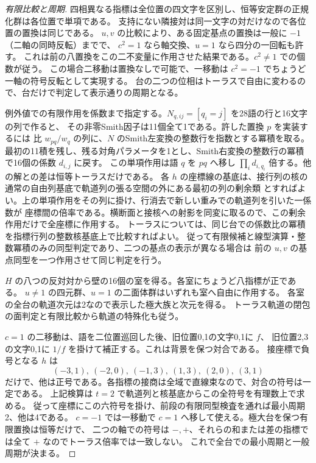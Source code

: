 \begin{proof}[有限比較と周期]
四相異なる指標は全位置の四文字を区別し、恒等安定群の正規化群は各位置で単項である。
支持にない隣接対は同一文字の対だけなので各位置の置換は同じである。
$u,v$ の比較により、ある固定基点の置換は一般に $-1$（二軸の同時反転）までで、
$c^2=1$ なら軸交換、$u=1$ なら四分の一回転も許す。
これは前の八置換をこの二不変量に作用させた結果である。$c^2\ne1$ での個数が従う。
この場合二移動は置換なしで可能で、一移動は $c^2=-1$ でちょうど一軸の符号反転として実現する。
台の二つの位相はトーラスで自由に変わるので、台だけで判定して表示通りの周期となる。

例外値での有限作用を係数まで指定する。$N_{q,ij}=[q_i=j]$ を28語の行と16文字の列で作ると、
その非零Smith因子は11個全て1である。許した置換 $p$ を実装するには
比 $w_{p q}/w_q$ の列に、$N$ のSmith左変換の整数行を指数とする冪積を取る。
最初の11積を残し、残る対角パラメータを1とし、Smith右変換の整数行の冪積で16個の係数 $d_{i,j}$ に戻す。
この単項作用は語 $q$ を $p q$ へ移し $\prod_i d_{i,q_i}$ 倍する。他の解との差は恒等トーラスだけである。
各 $h$ の座標線の基底は、接行列の核の通常の自由列基底で軌道列の張る空間の外にある最初の列の剰余類
とすればよい。上の単項作用をその列に掛け、行消去で新しい重みでの軌道列を引いた一係数が
座標間の倍率である。横断面と接核への射影を同変に取るので、この剰余作用だけで全座標に作用する。
トーラスについては、同じ台での係数比の冪積を指標行列の整数核基底上で比較すればよい。
従って有限候補と線型演算・整数冪積のみの同型判定であり、二つの基点の表示が異なる場合は
前の $u,v$ の基点同型を一つ作用させて同じ判定を行う。

$H$ の八つの反対対から壁の16個の室を得る。各室にちょうど八指標が正である。
$u\ne1$ の四元群、$u=1$ の二面体群はいずれも室へ自由に作用する。
各室の全台の軌道次元は2なので表示した極大族と次元を得る。
トーラス軌道の閉包の面判定と有限比較から軌道の特殊化も従う。

$c=1$ の二移動は、語を二位置巡回した後、旧位置0,1の文字0,1に $f$、
旧位置2,3の文字0,1に $1/f$ を掛けて補正する。これは背景を保つ対合である。
接座標で負号となる $h$ は
\[
       (-3,1),\ (-2,0),\ (-1,3),\ (1,3),\ (2,0),\ (3,1)
\]
だけで、他は正号である。各指標の接商は全域で直線束なので、対合の符号は一定である。
上記検算は $t=2$ で軌道列と核基底からこの全符号を有理数上で求める。
従って座標にこの六符号を掛け、前段の有限同型検査を通れば最小周期2、他は4である。
$c=-1$ では一移動で $c=1$ へ移して使える。極大台を保つ有限置換は恒等だけで、
二つの軸での符号は $-,+$、それらの和または差の指標では全て $+$ なのでトーラス倍率では一致しない。
これで全台での最小周期と一般周期が決まる。
\end{proof}
